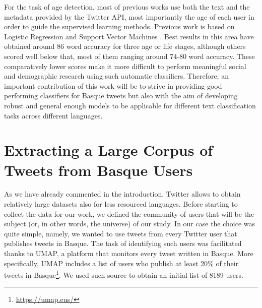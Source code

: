 \documentclass[information,article,submit,moreauthors,pdftex,10pt,a4paper]{Definitions/mdpi}
\begin{document}
For the task of age detection, most of previous works use both the text and the metadata provided by the Twitter API, most importantly the age of each user in order to guide the supervised learning methods. Previous work is based on Logistic Regression \cite{nguyen2013old,morgan2017predicting} and Support Vector Machines \cite{rao2010classifying,al2012homophily,marquardt2014age}. Best results in this area have obtained around 86 word accuracy \cite{nguyen2013old} for three age or life stages, although others scored well below that, most of them ranging around 74-80 word accuracy. These comparatively lower scores make it more difficult to perform meaningful social and demographic research using such automatic classifiers. Therefore, an important contribution of this work will be to strive in providing good performing classifiers for Basque tweets but also with the aim of developing robust and general enough models to be applicable for different text classification tasks across different languages.



\section{Extracting a Large Corpus of Tweets from Basque Users}\label{sec:data-extraction}

As we have already commented in the introduction, Twitter allows to obtain relatively large datasets also for less resourced languages. Before starting to collect the data for our work, we defined the community of users that will be the subject (or, in other words, the universe) of our study. In our case the choice was quite simple, namely, we wanted to use tweets from every Twitter user that publishes tweets in Basque. The task of identifying such users was facilitated thanks to UMAP, a platform that monitors every tweet written in Basque. More specifically, UMAP includes a list of users who publish at least 20\% of their tweets in Basque\footnote{\url{https://umap.eus/}}. We used such source to obtain an initial list of 8189 users.
\end{document}
